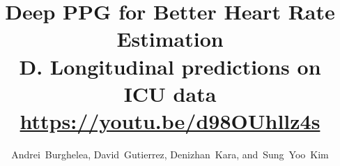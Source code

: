 \documentclass[12pt, conference]{IEEEtran}
\begin{document}
%
\title{Deep PPG for Better Heart Rate Estimation\\ 
	\Large{D. Longitudinal predictions on ICU data}\\
  \large{\url{https://youtu.be/d98OUhllz4s}}}
%
%
%

\author{Andrei~Burghelea,
        David~Gutierrez,
        Denizhan~Kara,
        and~Sung~Yoo~Kim}%

% 
%
\end{document}
